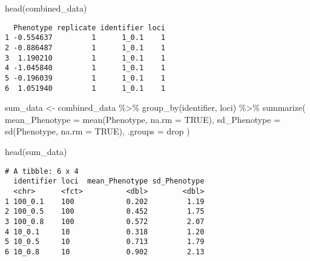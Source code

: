 \documentclass[
  letterpaper,
  DIV=11,
  numbers=noendperiod]{scrartcl}
\newenvironment{Shaded}{\begin{snugshade}}{\end{snugshade}}
\newcommand{\AttributeTok}[1]{\textcolor[rgb]{0.40,0.46,0.14}{#1}}
\newcommand{\ConstantTok}[1]{\textcolor[rgb]{0.56,0.35,0.01}{#1}}
\newcommand{\FunctionTok}[1]{\textcolor[rgb]{0.28,0.35,0.67}{#1}}
\newcommand{\NormalTok}[1]{\textcolor[rgb]{0.00,0.46,0.62}{#1}}
\newcommand{\OtherTok}[1]{\textcolor[rgb]{0.00,0.46,0.62}{#1}}
\newcommand{\SpecialCharTok}[1]{\textcolor[rgb]{0.37,0.37,0.37}{#1}}
\newcommand{\StringTok}[1]{\textcolor[rgb]{0.13,0.47,0.30}{#1}}
\begin{document}
\begin{Shaded}
\begin{Highlighting}[]
\FunctionTok{head}\NormalTok{(combined\_data)}
\end{Highlighting}
\end{Shaded}

\begin{verbatim}
  Phenotype replicate identifier loci
1 -0.554637         1      1_0.1    1
2 -0.886487         1      1_0.1    1
3  1.190210         1      1_0.1    1
4 -1.045840         1      1_0.1    1
5 -0.196039         1      1_0.1    1
6  1.051940         1      1_0.1    1
\end{verbatim}

\begin{Shaded}
\begin{Highlighting}[]
\NormalTok{sum\_data }\OtherTok{\textless{}{-}}\NormalTok{ combined\_data }\SpecialCharTok{\%\textgreater{}\%}
  \FunctionTok{group\_by}\NormalTok{(identifier, loci) }\SpecialCharTok{\%\textgreater{}\%}
  \FunctionTok{summarize}\NormalTok{(}
    \AttributeTok{mean\_Phenotype =} \FunctionTok{mean}\NormalTok{(Phenotype, }\AttributeTok{na.rm =} \ConstantTok{TRUE}\NormalTok{),}
    \AttributeTok{sd\_Phenotype =} \FunctionTok{sd}\NormalTok{(Phenotype, }\AttributeTok{na.rm =} \ConstantTok{TRUE}\NormalTok{),}
    \AttributeTok{.groups =} \StringTok{\textquotesingle{}drop\textquotesingle{}}
\NormalTok{  )}
\end{Highlighting}
\end{Shaded}

\begin{Shaded}
\begin{Highlighting}[]
\FunctionTok{head}\NormalTok{(sum\_data)}
\end{Highlighting}
\end{Shaded}

\begin{verbatim}
# A tibble: 6 x 4
  identifier loci  mean_Phenotype sd_Phenotype
  <chr>      <fct>          <dbl>        <dbl>
1 100_0.1    100            0.202         1.19
2 100_0.5    100            0.452         1.75
3 100_0.8    100            0.572         2.07
4 10_0.1     10             0.318         1.20
5 10_0.5     10             0.713         1.79
6 10_0.8     10             0.902         2.13
\end{verbatim}
\end{document}
